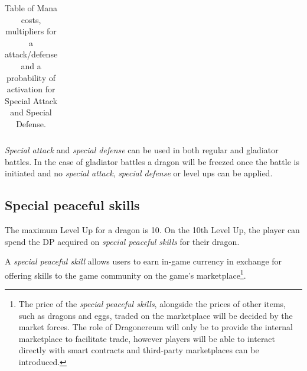 \documentclass[12pt]{article}
\begin{document}
{\begin{table}[!ht]
\begin{tabular}{p{0.68in}p{0.88in}p{0.88in}p{0.88in}p{0.88in}p{0.88in}}
\end{tabular}\caption{Table of Mana costs, multipliers for a attack/defense and a probability of activation for Special Attack and Special Defense.}
\label{tab:Table of Mana costs, multipliers for a attack/defense and a probability of activation for Special Attack and Special Defense.}

 \end{table}


\textit{Special attack} and \textit{special defense} can be used in both regular and gladiator battles. In the case of gladiator battles a dragon will be freezed once the battle is initiated and no \textit{special attack}, \textit{special defense} or level ups can be applied.\par

\subsection{Special peaceful skills}
\label{Special peaceful skills}  \par

The maximum Level Up for a dragon is 10. On the 10th Level Up, the player can spend the DP acquired on \textit{special peaceful skills} for their dragon.\par

A \textit{special peaceful skill} allows users to earn in-game currency in exchange for offering skills to the game community on the game’s marketplace\footnote{The price of the {\it special peaceful skills}, alongside the prices of other items, such as dragons and eggs, traded on the marketplace will be decided by the market forces. The role of Dragonereum will only be to provide the internal marketplace to facilitate trade, however players will be able to interact directly with smart contracts and third-party marketplaces can be introduced.}.\par

}
\end{document}
